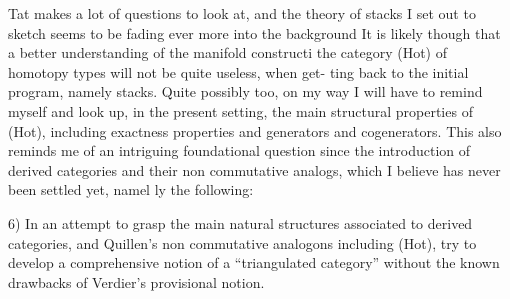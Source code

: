 Tat makes a lot of questions to look at,  and the theory of stacks I
set out to sketch seems to be fading ever more into the background  It is
likely though that a better  understanding of the manifold  constructi 
the category (Hot) of homotopy types will not be quite useless,  when get-%
ting back to the initial program,  namely stacks.  Quite possibly too,  on
my way I will have to remind myself  and look up,  in the present setting,
 the main structural properties of (Hot),  including exactness properties\hand{,}
and generators and cogenerators.  This also reminds me of an  intriguing
foundational question since the introduction of derived categories and their
non commutative analogs,  which I believe has never been settled yet,  namel%
\hand{-}ly the following:

6)  In an attempt to grasp the main natural structures associated to
derived categories,  and Quillen's non commutative analogons including
(Hot),  try to develop  a comprehensive notion of a ``triangulated category''\hand{,}
without the known drawbacks of  Verdier's provisional notion.
